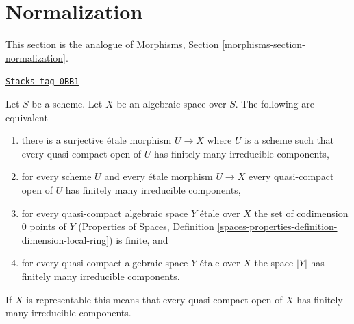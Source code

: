 \section{Normalization}
\label{spaces-morphisms-section-normalization}
This section is the analogue of
Morphisms, Section \ref{morphisms-section-normalization}.

\begin{lemma}
\label{spaces-morphisms-lemma-prepare-normalization}
\href{https://stacks.math.columbia.edu/tag/0BB1}{\texttt{Stacks tag 0BB1}}

Let $S$ be a scheme. Let $X$ be an algebraic space over $S$.
The following are equivalent
\begin{enumerate}
\item there is a surjective \'etale morphism $U \to X$ where $U$
is a scheme such that every quasi-compact open of $U$ has
finitely many irreducible components,
\item for every scheme $U$ and every \'etale morphism
$U \to X$ every quasi-compact open of $U$ has finitely many
irreducible components,
\item for every quasi-compact algebraic space $Y$ \'etale over $X$
the set of codimension $0$ points of $Y$ (Properties of Spaces,
Definition \ref{spaces-properties-definition-dimension-local-ring})
is finite, and
\item for every quasi-compact algebraic space $Y$ \'etale over $X$
the space $|Y|$ has finitely many irreducible components.
\end{enumerate}
If $X$ is representable this means that every quasi-compact open of $X$
has finitely many irreducible components.
\end{lemma}

